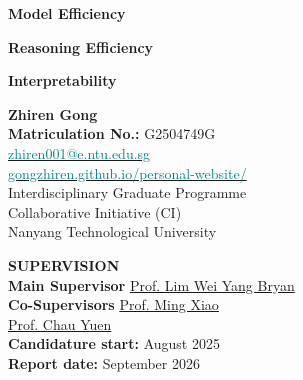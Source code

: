 \documentclass[12pt,a4paper]{article}
\begin{document}
\begin{titlepage}
\vspace{0.16cm}
\begin{tcbraster}[raster columns=3,raster equal height=rows,raster column skip=5pt]
\begin{tcolorbox}[colback=SoftBlue!55,colframe=NTUblue!55,boxrule=0.45pt,arc=3mm,halign=center,top=3.5pt,bottom=3.5pt]
\textsf{\bfseries\small Model Efficiency}
\end{tcolorbox}
\begin{tcolorbox}[colback=SoftTeal!70,colframe=Teal!60,boxrule=0.45pt,arc=3mm,halign=center,top=3.5pt,bottom=3.5pt]
\textsf{\bfseries\small Reasoning Efficiency}
\end{tcolorbox}
\begin{tcolorbox}[colback=Purple!7,colframe=Purple!55,boxrule=0.45pt,arc=3mm,halign=center,top=3.5pt,bottom=3.5pt]
\textsf{\bfseries\small Interpretability}
\end{tcolorbox}
\end{tcbraster}

\vfill
\noindent
\begin{minipage}[t]{0.47\textwidth}
{\Large\bfseries Zhiren Gong}\\[0.7mm]
\textbf{Matriculation No.:} G2504749G\\[0.5mm]
\href{mailto:zhiren001@e.ntu.edu.sg}{\textcolor{Teal}{zhiren001@e.ntu.edu.sg}}\\
\href{https://gongzhiren.github.io/personal-website/}{\textcolor{Teal}{gongzhiren.github.io/personal-website/}}\\[1.2mm]
Interdisciplinary Graduate Programme\\
Collaborative Initiative (CI)\\
Nanyang Technological University
\end{minipage}\hfill
\begin{minipage}[t]{0.49\textwidth}
\textsf{\bfseries\color{NTUblue}SUPERVISION}\\[0.8mm]
{\small\textbf{Main Supervisor}}\quad
\href{https://dr.ntu.edu.sg/entities/person/Lim-Wei-Yang-Bryan}{\textcolor{NTUblue}{Prof. Lim Wei Yang Bryan}}\\[0.6mm]
{\small\textbf{Co-Supervisors}}\quad
\href{https://www.kth.se/profile/mingx}{\textcolor{NTUblue}{Prof. Ming Xiao}}\\
\href{https://blogs.ntu.edu.sg/chau-yuen/}{\textcolor{NTUblue}{Prof. Chau Yuen}}\\[1.4mm]
\textbf{Candidature start:} August 2025\\
\textbf{Report date:} September 2026
\end{minipage}
\vspace{0.20cm}
\end{titlepage}
\end{document}
